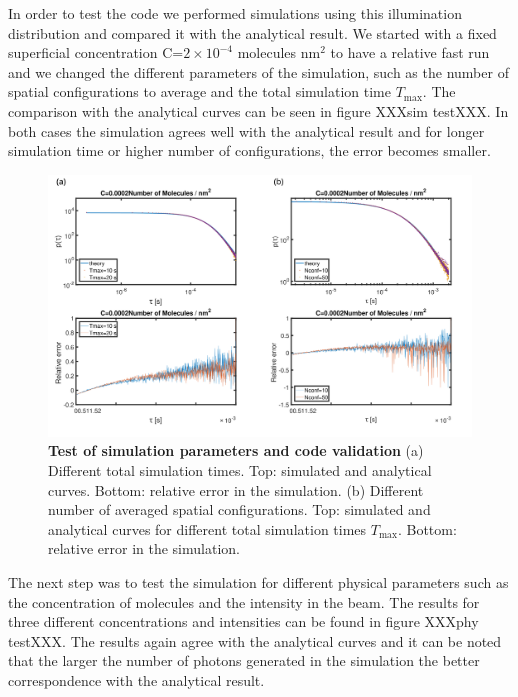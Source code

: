 

In order to test the code we performed simulations using this illumination distribution and compared it with the analytical result. We started with a fixed superficial concentration  C=$2 \times 10^{-4}$ molecules nm$^2$ to have a relative fast run and we changed the different parameters of the simulation, such as the number of spatial configurations to average and the total simulation time $T_{\mbox{max}}$. The comparison with the analytical curves can be seen in figure XXXsim testXXX. In both cases the simulation agrees well with the analytical result and for longer simulation time or higher number of configurations, the error becomes smaller.


 \begin{figure}
 \includegraphics[width=\textwidth]{Theta_results}%
 \caption{\textbf{Test of simulation parameters and code validation} 
(a) Different total simulation times. Top: simulated and analytical curves. Bottom: relative error in the simulation.
(b) Different number of averaged spatial configurations. Top: simulated and analytical curves for different total simulation times $T_{\mbox{max}}$. Bottom: relative error in the simulation.
\label{fg:Theta_results}}
\end{figure}


The next step was to test the simulation for different physical parameters such as the concentration of molecules and the intensity in the beam. The results for three different concentrations and intensities can be found in figure XXXphy testXXX. The results again agree with the analytical curves and it can be noted that the larger the number of photons generated in the simulation the better correspondence with the analytical result.


